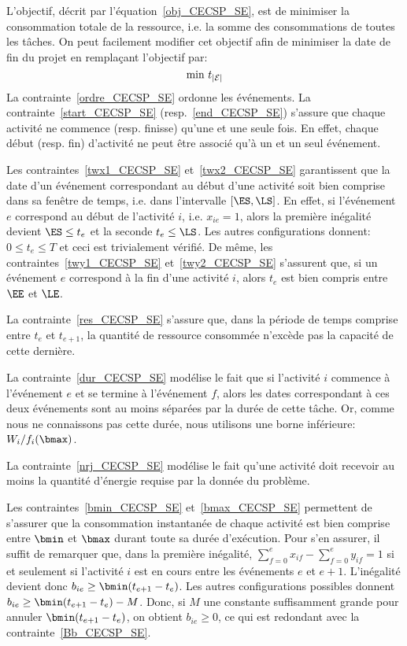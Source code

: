 L'objectif, décrit par l'équation~\eqref{obj_CECSP_SE}, est de
minimiser la consommation totale de la ressource, i.e. la somme des
consommations de toutes les tâches. On peut facilement modifier cet
objectif afin de minimiser la date de fin du projet en remplaçant
l'objectif par:
\begin{equation}
\text{min } t_{|{\cal E}|} \notag
\end{equation}
La contrainte~\eqref{ordre_CECSP_SE} ordonne les événements. La
contrainte~\eqref{start_CECSP_SE} (resp.~\eqref{end_CECSP_SE})
s'assure que chaque activité ne commence (resp. finisse) qu'une et une
seule fois. En effet, chaque début (resp. fin) d'activité ne peut être
associé qu'à un et un seul événement.
 
Les contraintes~\eqref{twx1_CECSP_SE} et~\eqref{twx2_CECSP_SE}
garantissent que la date d'un événement correspondant au début d'une
activité soit bien comprise dans sa fenêtre de temps, i.e. dans
l'intervalle $[\ES,\LS]$. En effet, si l'événement $e$ correspond au
début de l'activité $i$, i.e. $x_{ie}=1$, alors la première inégalité
devient $\ES \le t_e$ et la seconde $t_e \le \LS$. Les autres
configurations donnent: $0 \le t_e \le T$ et ceci est trivialement
vérifié. De même, les contraintes~\eqref{twy1_CECSP_SE}
et~\eqref{twy2_CECSP_SE} s'assurent que, si un événement $e$
correspond à la fin d'une activité $i$, alors $t_e$ est bien compris
entre $\EE$ et $\LE$.

La contrainte~\eqref{res_CECSP_SE} s'assure que, dans la période de
temps comprise entre $t_e$ et $t_{e+1}$, la quantité de ressource
consommée n’excède pas la capacité de cette dernière.

La contrainte~\eqref{dur_CECSP_SE} modélise le fait que si l'activité
$i$ commence à l'événement $e$ et se termine à l'événement $f$, alors
les dates correspondant à ces deux événements sont au moins séparées
par la durée de cette tâche. Or, comme nous ne connaissons pas cette
durée, nous utilisons une borne inférieure: $W_i/f_i(\bmax)$.

La contrainte~\eqref{nrj_CECSP_SE} modélise le fait qu'une activité
doit recevoir au moins la quantité d'énergie requise par la donnée du
problème.

Les contraintes~\eqref{bmin_CECSP_SE} et~\eqref{bmax_CECSP_SE}
permettent de s'assurer que la consommation instantanée de chaque
activité est bien comprise entre $\bmin$ et $\bmax$ durant toute sa
durée d'exécution. Pour s'en assurer, il suffit de remarquer que, dans
la première inégalité, $\sum_{f=0}^{e} x_{if}-\sum_{f=0}^{e}y_{if}=1$
si et seulement si l'activité $i$ est en cours entre les événements
$e$ et $e+1$.  L'inégalité devient donc $b_{ie} \ge
\bmin(t_{e+1}-t_e)$. Les autres configurations possibles donnent
$b_{ie} \ge \bmin(t_{e+1}-t_e)-M$. Donc, si $M$ une constante
suffisamment grande pour annuler $\bmin(t_{e+1}-t_e)$, on obtient
$b_{ie} \ge 0$, ce qui est redondant avec la
contrainte~\eqref{Bb_CECSP_SE}.

